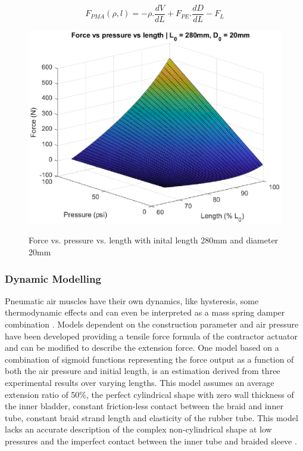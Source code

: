 \documentclass[11pt,a4paper]{article}
\begin{document}
\begin{equation}
F_{PMA}(\rho, l) = -\rho.\frac{dV}{dL}+F_{PE}.\frac{dD}{dL}-F_L
\label{math:staticforce}
\end{equation}

\begin{figure}[hbt!]
    \centering
    \caption{Force vs. pressure vs. length with inital length 280mm and diameter 20mm}
    \includegraphics[scale=0.6]{staticmap.eps}
    \label{fig:staticmap}
\end{figure}

\subsubsection{Dynamic Modelling}
\label{sub:dynamic_modelling}
Pneumatic air muscles have their own dynamics, like hysteresis, some thermodynamic effects and can even be interpreted as a mass spring damper combination \cite{martens_boblan_2017}. Models dependent on the construction parameter and air pressure have been developed providing a tensile force formula of the contractor actuator and can be modified to describe the extension force. One model based on a combination of sigmoid functions representing the force output as a function of both the air pressure and initial length, is an estimation derived from three experimental results over varying lengths. This model assumes an average extension ratio of 50\%, the perfect cylindrical shape with zero wall thickness of the inner bladder, constant friction-less contact between the braid and inner tube, constant braid strand length and elasticity of the rubber tube. This model lacks an accurate description of the complex non-cylindrical shape at low pressures and the imperfect contact between the inner tube and braided sleeve \cite{al-ibadi_nefti-meziani_davis_2018}. \newline
\end{document}
